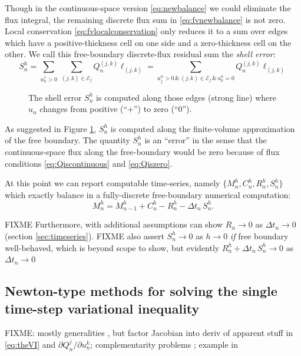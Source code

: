 \documentclass[final,leqno,onefignum,onetabnum]{siamltex1213bueler}
\begin{document}
Though in the continuous-space version \eqref{eq:newbalance} we could eliminate the flux integral, the remaining discrete flux sum in \eqref{eq:fvnewbalance} is not zero.  Local conservation \eqref{eq:fvlocalconservation} only reduces it to a sum over edges which have a positive-thickness cell on one side and a zero-thickness cell on the other.  We call this free-boundary discrete-flux residual sum the \emph{shell error}:
\begin{equation}
S_n^h = \sum_{u_n^j>0}\, \sum_{(j,k)\in\mathcal{E}_j} Q_n^{(j,k)} \ell_{(j,k)} = \sum_{u_j^n > 0 \,\&\, (j,k)\in\mathcal{E}_j \,\&\, u_k^n = 0} Q_n^{(j,k)} \ell_{(j,k)} \label{eq:fvderiveshellerror}
\end{equation}

\begin{figure}[ht]
\begin{center}

\end{center}
\caption{The shell error $S_n^h$ is computed along those edges (strong line) where $u_n$ changes from positive (``$+$'') to zero (``$0$'').}
\label{fig:fvmesh-shellerror}
\end{figure}

As suggested in Figure \ref{fig:fvmesh-shellerror}, $S_n^h$ is computed along the finite-volume approximation of the free boundary.  The quantity $S_n^h$ is an ``error'' in the sense that the continuous-space flux along the free-boundary would be zero because of flux conditions \eqref{eq:Qiscontinuous} and \eqref{eq:Qiszero}.

At this point we can report computable time-series, namely $\{M_n^h,C_n^h,R_n^h,S_n^h\}$ which exactly balance in a fully-discrete free-boundary numerical computation:
\begin{equation}
  M_n^h = M_{n-1}^h + C_n^h - R_n^h - \Delta t_n\,S_n^h. \label{eq:fvfinalbalance}
\end{equation}

FIXME Furthermore, with additional assumptions can show $R_n\to 0$ as $\Delta t_n\to 0$ (section \ref{sec:timeseries}).  FIXME also assert $S_n^h\to 0$ as $h\to 0$ \emph{if} free boundary well-behaved, which is beyond scope to show, but evidently $R_n^h + \Delta t_n\,S_n^h \to 0$ as $\Delta t_n\to 0$

\subsection{Newton-type methods for solving the single time-step variational inequality} \label{subsec:newtonvi}  FIXME: mostly generalities \cite{Kelley2003}, but factor Jacobian into deriv of apparent stuff in \eqref{eq:theVI} and $\partial Q_n^j/\partial u_n^k$; complementarity problems \cite{BensonMunson2006,BillupsMurty2000}; example in \cite{Bueler2015}
\end{document}
